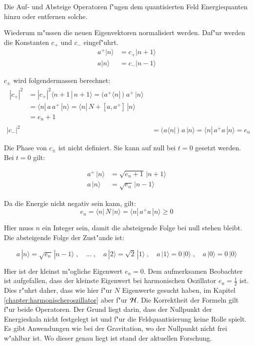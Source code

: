 Die Auf- und Absteige Operatoren f"ugen dem quantisierten Feld Energiequanten hinzu oder entfernen solche.

Wiederum m"ussen die neuen Eigenvektoren normalisiert werden. Daf"ur werden die Konstanten $c_+$ und $c_-$ eingef"uhrt.
\begin{align*}
a^+|n\rangle &= c_+|n+1\rangle \\
a|n\rangle &= c_-|n-1\rangle
\end{align*}

$c_\pm$ wird folgendermassen berechnet:
\begin{align*}
\begin{split}
	|c_+|^2 &= |c_+|^2 \langle n+1 \, | \, n+1 \rangle = ( a^+ \langle n |\,) \; a^+ \,| n \rangle \\
		&= \langle n |\, a \, a^+ \,|n \rangle = \langle n |\, N + [a,a^+] \,|n \rangle \\
		&= e_n+1
\end{split}\\
	|c_-|^2 &= 	( a \langle n |\,) \; a \,| n \rangle = \langle n |\, a^+ a \,| n \rangle = e_n
\end{align*}

Die Phase von $c_{\pm}$ ist nicht definiert. Sie kann auf null bei $t=0$ gesetzt werden. Bei $t=0$ gilt:

\begin{align*}
a^+\,|n\rangle &= \sqrt{e_n+1}\,|n+1\rangle \\
a\,|n\rangle &= \sqrt{e_n}\,|n-1\rangle
\end{align*}

Da die Energie nicht negativ sein kann, gilt:
\begin{equation*}
e_n = \langle n |\, N \,|n \rangle = \langle n |\, a^+a \,|n \rangle \geq 0
\end{equation*}

Hier muss $n$ ein Integer sein, damit die absteigende Folge bei null stehen bleibt. Die absteigende Folge der Zust"ande ist:

\begin{equation*}
a\,|n\rangle = \sqrt{e_n}\,|n-1\rangle  \;, \quad \hdots \; , \quad a\,|2\rangle = \sqrt{2}\,|1\rangle \; , \quad a\,|1\rangle = 0\,|0\rangle \;, \quad a\,|0\rangle = 0\,|0\rangle
\end{equation*}

Hier ist der kleinst m"ogliche Eigenwert $e_n = 0$. Dem aufmerksamen Beobachter ist aufgefallen, dass der kleinste Eigenwert bei harmonischen Oszillator $e_n = \frac{1}{2}$ ist. Dies r"uhrt daher, dass wie hier f"ur $N$ Eigenwerte gesucht haben, im Kapitel \ref{chapter:harmonischeroszillator} aber f"ur ${\cal H}$. Die Korrektheit der Formeln gilt f"ur beide Operatoren. Der Grund liegt darin, dass der Nullpunkt der Energieskala nicht festgelegt ist und f"ur die Feldquantisierung keine Rolle spielt. Es gibt Anwendungen wie bei der Gravitation, wo der Nullpunkt nicht frei w"ahlbar ist. Wo dieser genau liegt ist stand der aktuellen Forschung.

